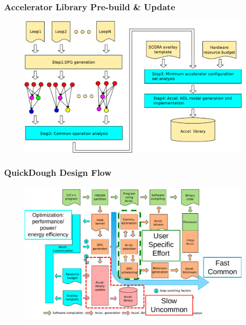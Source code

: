 \documentclass[accentcolor=tud1a,colorbacktitle,inverttitle,landscape,german,presentation,t]{tudbeamer}
\begin{document}
\begin{frame}
\frametitle{Accelerator Library Pre-build \& Update}
  \begin{figure}
     \includegraphics[width=.85\linewidth]{lib-build}
  \end{figure}
\end{frame}

\begin{frame}
  \frametitle{QuickDough Design Flow}
  \begin{figure}
     \includegraphics[width=.95\linewidth]{qd-flow5}
  \end{figure}
  \end{frame}
\end{document}
